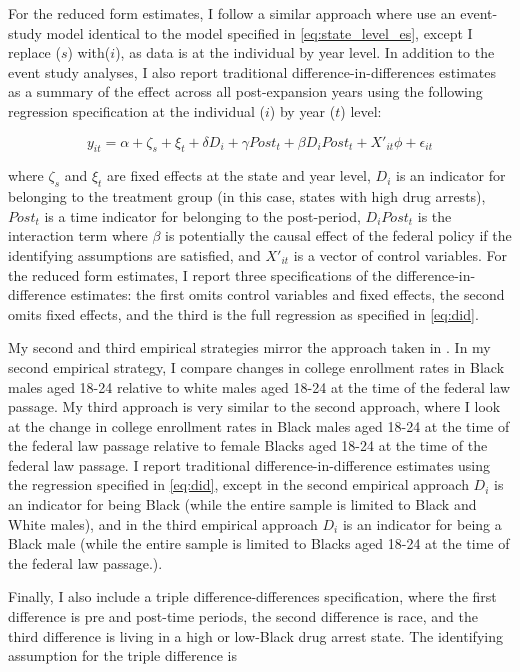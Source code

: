 \documentclass{article}
\begin{document}
For the reduced form estimates, I follow a similar approach where use an event-study model identical to the model specified in \ref{eq:state_level_es}, except I replace ($s$) with($i$), as data is at the individual by year level. In addition to the event study analyses, I also report traditional difference-in-differences estimates as a summary of the effect across all post-expansion years using the following regression specification at the individual ($i$) by year ($t$) level: 

\begin{equation} \label{eq:did}
  y_{it} = \alpha + \zeta_s + \xi_t + \delta D_i + \gamma Post_t + \beta D_i Post_t + X'_{it}\phi + \epsilon_{it}
\end{equation}

where $\zeta_s$ and $\xi_t$ are fixed effects at the state and year level, $D_{i}$ is an indicator for belonging to the treatment group (in this case, states with high drug arrests), $Post_t$ is a time indicator for belonging to the post-period, $D_i Post_t$ is the interaction term where $\beta$ is potentially the causal effect of the federal policy if the identifying assumptions are satisfied, and $X'_{it}$ is a vector of control variables. For the reduced form estimates, I report three specifications of the difference-in-difference estimates: the first omits control variables and fixed effects, the second omits fixed effects, and the third is the full regression as specified in \ref{eq:did}.

My second and third empirical strategies mirror the approach taken in \cite {britton2022}. In my second empirical strategy, I compare changes in college enrollment rates in Black males aged 18-24 relative to white males aged 18-24 at the time of the federal law passage. My third approach is very similar to the second approach, where I look at the change in college enrollment rates in Black males aged 18-24 at the time of the federal law passage relative to female Blacks aged 18-24 at the time of the federal law passage. I report traditional difference-in-difference estimates using the regression specified in \ref{eq:did}, except in the second empirical approach $D_i$ is an indicator for being Black (while the entire sample is limited to Black and White males), and in the third empirical approach $D_i$ is an indicator for being a Black male (while the entire sample is limited to Blacks aged 18-24 at the time of the federal law passage.).

Finally, I also include a triple difference-differences specification, where the first difference is pre and post-time periods, the second difference is race, and the third difference is living in a high or low-Black drug arrest state. The identifying assumption for the triple difference is 
\end{document}
